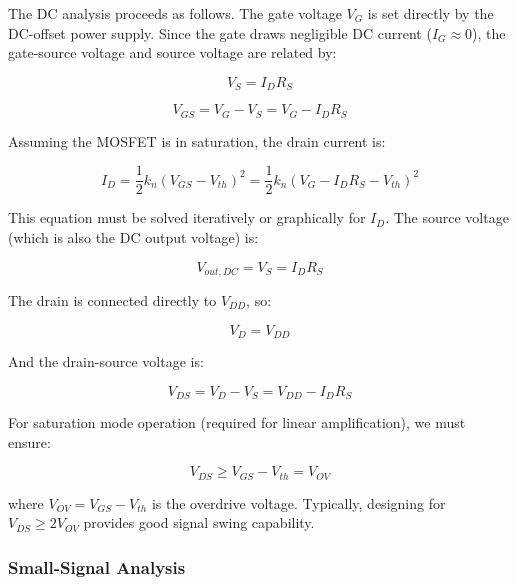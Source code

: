 \documentclass[10pt]{article}
\begin{document}
The DC analysis proceeds as follows.  The gate voltage $V_G$ is set directly by the DC-offset power supply.  Since the gate draws negligible DC current ($I_G \approx 0$), the gate-source voltage and source voltage are related by: 

\begin{equation}
    V_S = I_D R_S
    \label{eq:vs}
\end{equation}

\begin{equation}
    V_{GS} = V_G - V_S = V_G - I_D R_S
    \label{eq:vgs}
\end{equation}

Assuming the MOSFET is in saturation, the drain current is:

\begin{equation}
    I_D = \frac{1}{2} k_n (V_{GS} - V_{th})^2 = \frac{1}{2} k_n (V_G - I_D R_S - V_{th})^2
    \label{eq:id_dc}
\end{equation}

This equation must be solved iteratively or graphically for $I_D$. The source voltage (which is also the DC output voltage) is:

\begin{equation}
    V_{out,DC} = V_S = I_D R_S
    \label{eq:vout_dc}
\end{equation}

The drain is connected directly to $V_{DD}$, so:

\begin{equation}
    V_D = V_{DD}
    \label{eq:vd}
\end{equation}

And the drain-source voltage is:

\begin{equation}
    V_{DS} = V_D - V_S = V_{DD} - I_D R_S
    \label{eq:vds}
\end{equation}

For saturation mode operation (required for linear amplification), we must ensure: 

\begin{equation}
    V_{DS} \geq V_{GS} - V_{th} = V_{OV}
    \label{eq:sat_condition}
\end{equation}

where $V_{OV} = V_{GS} - V_{th}$ is the overdrive voltage.  Typically, designing for $V_{DS} \geq 2V_{OV}$ provides good signal swing capability.

\subsubsection{Small-Signal Analysis}
\end{document}

